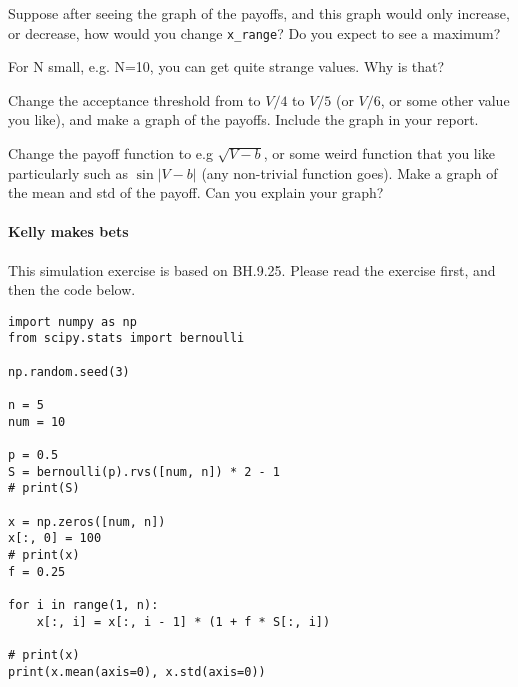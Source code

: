 \documentclass[assignments]{subfiles}
\begin{document}
\begin{exercise}
Suppose after seeing the graph of the payoffs, and this graph would only increase, or decrease, how would you change \verb|x_range|? Do you expect to see a maximum?
\begin{solution}
\end{solution}
\end{exercise}




\begin{exercise}
For N small, e.g. N=10, you can get quite strange values. Why is that?
\begin{solution}
\end{solution}
\end{exercise}


\begin{exercise}
Change the acceptance threshold from to $V/4$ to $V/5$ (or $V/6$, or some other value you like), and make a graph of the payoffs.
Include the graph in your report.
\begin{solution}
\end{solution}
\end{exercise}

\begin{exercise}
Change the payoff function to e.g $\sqrt{V-b}$, or some weird function that you like particularly such as $\sin |V-b|$ (any non-trivial function goes).
Make a graph of the  mean and std of the payoff. Can you explain your graph?
\begin{solution}
\end{solution}
\end{exercise}

\paragraph{Kelly makes bets}

This simulation exercise is based on BH.9.25.  Please read the exercise first, and then the code below.



\begin{verbatim}
import numpy as np
from scipy.stats import bernoulli

np.random.seed(3)

n = 5
num = 10

p = 0.5
S = bernoulli(p).rvs([num, n]) * 2 - 1
# print(S)

x = np.zeros([num, n])
x[:, 0] = 100
# print(x)
f = 0.25

for i in range(1, n):
    x[:, i] = x[:, i - 1] * (1 + f * S[:, i])

# print(x)
print(x.mean(axis=0), x.std(axis=0))
\end{verbatim}
\end{document}
